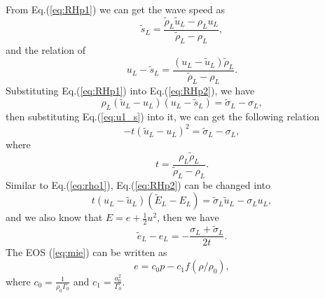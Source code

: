 \documentclass{article}
\numberwithin{equation}{section}
\numberwithin{table}{section}
\begin{document}
 From Eq.(\ref{eq:RHp1}) we can get the wave speed as
  \begin{equation}
	\widetilde{s}_L = \frac{\widetilde{\rho}_L \widetilde{u}_L-\rho_Lu_L}{\widetilde{\rho}_L-\rho_L},
  \end{equation}
and the relation of
\begin{equation}\label{eq:u1_s}
  u_L-\widetilde{s}_L = \frac{(u_L-\widetilde{u}_L)\widetilde{\rho}_L}{\widetilde{\rho}_L-\rho_L}.
\end{equation}
Substituting Eq.(\ref{eq:RHp1}) into Eq.(\ref{eq:RHp2}), we have
\begin{equation}\label{eq:rho1}
  \rho_L(\widetilde{u}_L - u_L)(u_L-\widetilde{s}_L) = \widetilde{\sigma}_L -\sigma_L,
\end{equation}
then substituting Eq.(\ref{eq:u1_s}) into it, we can get the following relation
\begin{equation}\label{eq:tu_2}
  -t(\widetilde{u}_L-u_L)^2 = \widetilde{\sigma}_L-\sigma_L,
\end{equation}
where
\begin{equation}
t=\frac{\rho_L \widetilde{\rho}_L}{\widetilde{\rho}_L-\rho_L}.
\end{equation}
Similar to Eq.(\ref{eq:rho1}), Eq.(\ref{eq:RHp2}) can be changed into
\begin{equation}
  t(u_L-\widetilde{u}_L)(\widetilde{E}_L-E_L) =\widetilde{\sigma}_L\widetilde{u}_L-\sigma_Lu_L,
\end{equation}
and we also know that $E = e+\frac{1}{2}u^2$, then we have
\begin{equation}\label{eq:e21}
  \widetilde{e}_L-e_L= -\frac{\sigma_L+\widetilde{\sigma}_L}{2t}.
\end{equation}
The EOS (\ref{eq:mie}) can be written as
\begin{equation} \label{eq:eos1}
  e=c_0 p-c_1f(\rho/\rho_0),
\end{equation}
where $c_0=\frac{1}{\rho_0\Gamma_0}$ and $c_1=\frac{a_0^2}{\Gamma_0}$.
\end{document}
